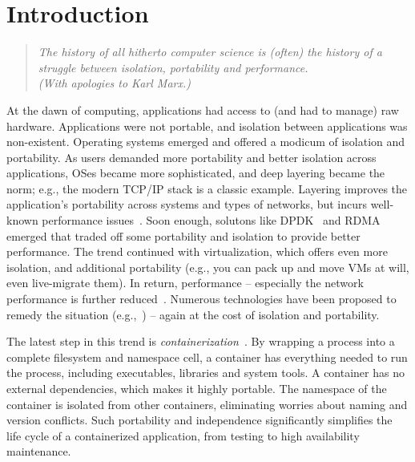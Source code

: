 \section{Introduction} 
\label{sec:introduction}

\begin{quote}
{\em 
The history of all hitherto computer science is (often) the history of a
struggle between isolation, portability and performance. \\ 
(With apologies to Karl Marx.)}
\end{quote}

At the dawn of computing, applications had access to (and had to manage) raw
hardware. Applications were not portable, and isolation between applications was
non-existent. Operating systems emerged and offered a modicum of isolation and
portability.  As users demanded more portability and better isolation across
applications, OSes became more sophisticated, and deep layering became the norm;
e.g., the modern TCP/IP stack is a classic example.  Layering improves the
application's portability across systems and types of  networks, but incurs
well-known performance issues~\cite{dcqcn,luigipapers}. Soon enough, solutons
like DPDK~\cite{dpdk} and RDMA~\cite{rdma} emerged that traded off some
portability and isolation to provide better performance.  The trend continued
with virtualization, which offers even more isolation, and additional
portability (e.g., you can pack up and move VMs at will, even live-migrate
them). In return, performance -- especially the network performance is further
reduced~\cite{xxx}. Numerous technologies have been proposed to remedy the
situation (e.g.,~\cite{sriov,netvm,netmap,dpdk}) -- again at the cost of
isolation and portability.

The latest step in this trend is {\em containerization}~\cite{XXX}.  By wrapping
a process into a complete filesystem and namespace cell, a container has
everything needed to run the process, including executables, libraries and
system tools.  A container has no external dependencies, which makes it highly
portable. The namespace of the container is isolated from other containers,
eliminating worries about naming and version conflicts.  Such portability and
independence significantly simplifies the life cycle of a containerized
application, from testing to high availability maintenance. 

